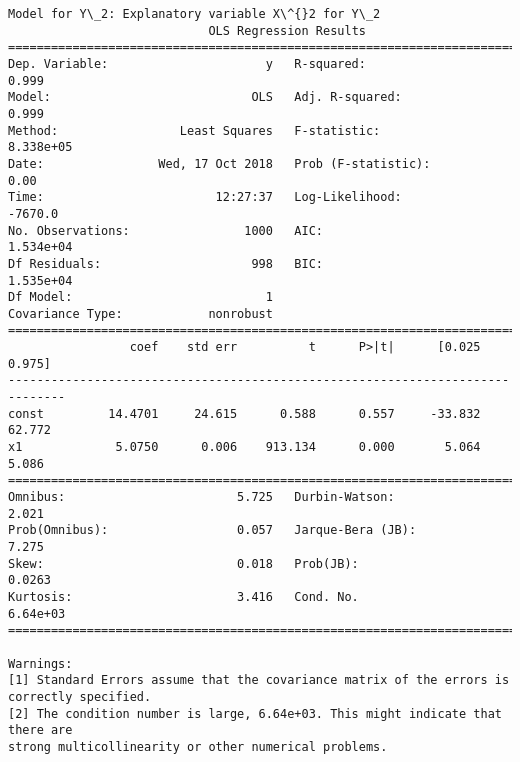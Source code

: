 \documentclass[11pt]{article}
\begin{document}
\begin{Verbatim}[commandchars=\\\{\}]
Model for Y\_2: Explanatory variable X\^{}2 for Y\_2
                            OLS Regression Results                            
==============================================================================
Dep. Variable:                      y   R-squared:                       0.999
Model:                            OLS   Adj. R-squared:                  0.999
Method:                 Least Squares   F-statistic:                 8.338e+05
Date:                Wed, 17 Oct 2018   Prob (F-statistic):               0.00
Time:                        12:27:37   Log-Likelihood:                -7670.0
No. Observations:                1000   AIC:                         1.534e+04
Df Residuals:                     998   BIC:                         1.535e+04
Df Model:                           1                                         
Covariance Type:            nonrobust                                         
==============================================================================
                 coef    std err          t      P>|t|      [0.025      0.975]
------------------------------------------------------------------------------
const         14.4701     24.615      0.588      0.557     -33.832      62.772
x1             5.0750      0.006    913.134      0.000       5.064       5.086
==============================================================================
Omnibus:                        5.725   Durbin-Watson:                   2.021
Prob(Omnibus):                  0.057   Jarque-Bera (JB):                7.275
Skew:                           0.018   Prob(JB):                       0.0263
Kurtosis:                       3.416   Cond. No.                     6.64e+03
==============================================================================

Warnings:
[1] Standard Errors assume that the covariance matrix of the errors is correctly specified.
[2] The condition number is large, 6.64e+03. This might indicate that there are
strong multicollinearity or other numerical problems.



\end{Verbatim}
\end{document}
